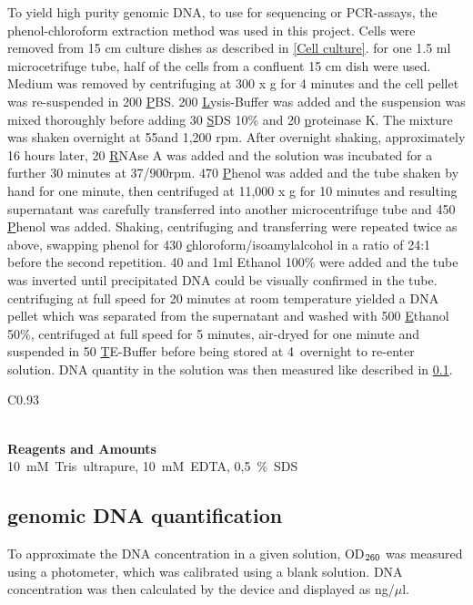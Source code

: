 To yield high purity genomic DNA, to use for sequencing or PCR-assays, the phenol-chloroform extraction method was used in this project. Cells were removed from 15 cm culture dishes as described in \ref{Cell culture}. for one 1.5 ml microcetrifuge tube, half of the cells from a confluent 15 cm dish were used. Medium was removed by centrifuging at 300 x g for 4 minutes and the cell pellet was re-suspended in 200 \ul PBS. 200 \ul Lysis-Buffer was added and the suspension was mixed thoroughly before adding 30 \ul SDS 10\% and 20 \ul proteinase K. The mixture was shaken overnight at 55\C and 1,200 rpm.
After overnight shaking, approximately 16 hours later, 20 \ul RNAse A was added and the solution was incubated for a further 30 minutes at 37\C/900rpm. 470 \ul Phenol was added and the tube shaken by hand for one minute, then centrifuged at 11,000 x g for 10 minutes and resulting supernatant was carefully transferred into another microcentrifuge tube and 450 \ul Phenol was added. Shaking, centrifuging  and transferring were repeated twice as above, swapping phenol for 430 \ul chloroform/isoamylalcohol in a ratio of 24:1 before the second repetition. 40 \ul {} and 1ml Ethanol 100\% were added and the tube was inverted until precipitated DNA could be visually confirmed in the tube. centrifuging at full speed for 20 minutes at room temperature yielded a DNA pellet which was separated from the supernatant and washed with 500 \ul Ethanol 50\%, centrifuged at full speed for 5 minutes, air-dryed for one minute and suspended in 50 \ul TE-Buffer before being stored at 4\C \ overnight to re-enter solution. DNA quantity in the solution was then measured like described in \ref{OD measure}.  

\begin{longtable}{C{0.93\linewidth}}
\caption{Lysis buffer composition}
\label{Lysis buffer composition} 
\\
\toprule
{}
\textbf{Reagents and Amounts} \\
\midrule
\endfirsthead
\bottomrule
\endfoot
\mbox{10 mM Tris ultrapure}, \mbox{10 mM EDTA},  \mbox{0,5 \% SDS}
\end{longtable}


\subsection{genomic DNA quantification}
\label{OD measure}
To approximate the DNA concentration in a given solution, OD$_{\textnormal{\scriptsize 260}}$ was measured using a photometer, which was calibrated using a blank solution. DNA concentration was then calculated by the device and displayed as ng/\(\mu\)l.

